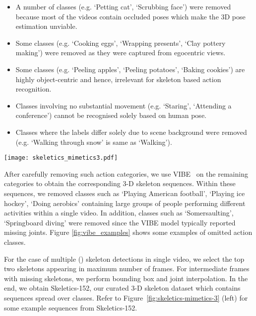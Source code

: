 \documentclass[twocolumn]{svjour3}          \smartqed  \usepackage{graphicx}
\begin{document}
\begin{itemize}
\item A number of classes (e.g. `Petting cat', `Scrubbing face') were removed because most of the videos contain occluded poses which make the 3D pose estimation unviable.
\item Some classes (e.g. `Cooking eggs', `Wrapping presents', `Clay pottery making') were removed as they were captured from egocentric views.
\item Some classes (e.g. `Peeling apples', `Peeling potatoes', `Baking cookies') are highly object-centric and hence, irrelevant for skeleton based action recognition.
\item Classes involving no substantial movement (e.g. `Staring', `Attending a conference') cannot be recognised solely based on human pose.
\item Classes where the labels differ solely due to scene background were removed (e.g. `Walking through snow'   is same as `Walking').
\end{itemize}

\begin{figure*}[!t]
    \centering
    \texttt{[image: skeletics\_mimetics3.pdf]}
    \caption{Sample skeleton sequences from Skeletics-152 and Mimetics-Skeleton. The sequences are chosen from best-3 and worst-3 classes in terms of performance achieved by best models on these datasets (see Tables~\ref{tab:Kinetics-results},~\ref{tab:Mimetics-test-results}). The ground-truth phrase is color-coded green. The top-5 predictions by 4s-ShiftGCN  are coded pink and those by MS-G3D are coded blue. Refer to Section \ref{sec:skwild} for details on the evaluation protocol and predictions.}
    \label{fig:skeletics-mimetics-3}
\end{figure*}

After carefully removing such action categories, we use VIBE~\cite{kocabas2019vibe} on the remaining  categories to obtain the corresponding 3-D skeleton sequences. Within these sequences, we removed classes such as `Playing American football', `Playing ice hockey', `Doing aerobics' containing large groups of people performing different activities within a single video. In addition, classes such as `Somersaulting', `Springboard diving'  were removed since the VIBE model typically reported missing joints. Figure \ref{fig:vibe_examples} shows some examples of omitted action classes. 

For the case of multiple () skeleton detections in single video, we select the top two skeletons appearing in maximum number of frames. For intermediate frames with missing skeletons, we perform bounding box and joint interpolation. In the end, we obtain Skeletics-152, our curated 3-D skeleton dataset which contains  sequences spread over  classes. Refer to Figure~\ref{fig:skeletics-mimetics-3} (left) for some example sequences from Skeletics-152.
\end{document}
